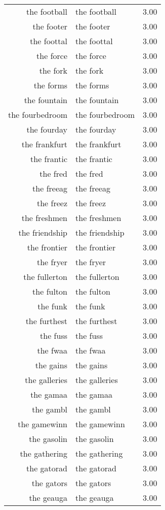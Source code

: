 \begin{table}[ht]
\begin{tabular}{rlr}
  the football & the football & 3.00 \\ 
  the footer & the footer & 3.00 \\ 
  the foottal & the foottal & 3.00 \\ 
  the force & the force & 3.00 \\ 
  the fork & the fork & 3.00 \\ 
  the forms & the forms & 3.00 \\ 
  the fountain & the fountain & 3.00 \\ 
  the fourbedroom & the fourbedroom & 3.00 \\ 
  the fourday & the fourday & 3.00 \\ 
  the frankfurt & the frankfurt & 3.00 \\ 
  the frantic & the frantic & 3.00 \\ 
  the fred & the fred & 3.00 \\ 
  the freeag & the freeag & 3.00 \\ 
  the freez & the freez & 3.00 \\ 
  the freshmen & the freshmen & 3.00 \\ 
  the friendship & the friendship & 3.00 \\ 
  the frontier & the frontier & 3.00 \\ 
  the fryer & the fryer & 3.00 \\ 
  the fullerton & the fullerton & 3.00 \\ 
  the fulton & the fulton & 3.00 \\ 
  the funk & the funk & 3.00 \\ 
  the furthest & the furthest & 3.00 \\ 
  the fuss & the fuss & 3.00 \\ 
  the fwaa & the fwaa & 3.00 \\ 
  the gains & the gains & 3.00 \\ 
  the galleries & the galleries & 3.00 \\ 
  the gamaa & the gamaa & 3.00 \\ 
  the gambl & the gambl & 3.00 \\ 
  the gamewinn & the gamewinn & 3.00 \\ 
  the gasolin & the gasolin & 3.00 \\ 
  the gathering & the gathering & 3.00 \\ 
  the gatorad & the gatorad & 3.00 \\ 
  the gators & the gators & 3.00 \\ 
  the geauga & the geauga & 3.00 \\ 

\end{tabular}
\end{table}
